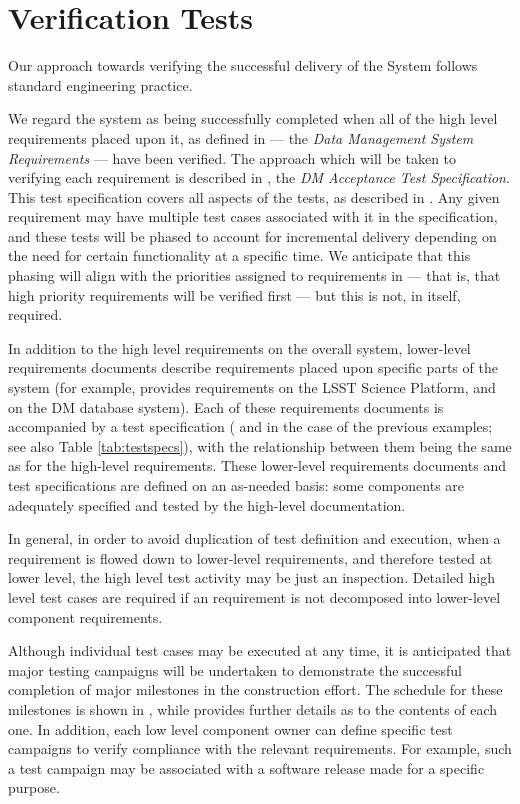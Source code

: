 \section{Verification Tests \label{sect:approach}}

Our approach towards verifying the successful delivery of the \product{} System follows standard engineering practice.

We regard the system as being successfully completed when all of the high level requirements placed upon it, as defined in  --- the \emph{Data Management System Requirements} --- have been verified.
The approach which will be taken to verifying each requirement is described in , the \emph{DM Acceptance Test Specification}.
This test specification covers all aspects of the tests, as described in .
Any given requirement may have multiple test cases associated with it in the specification, and these tests will be phased to account for incremental delivery depending on the need for certain functionality at a specific time.
We anticipate that this phasing will align with the priorities assigned to requirements in  --- that is, that high priority requirements will be verified first --- but this is not, in itself, required.

In addition to the high level requirements on the overall \product{} system, lower-level requirements documents describe requirements placed upon specific parts of the system (for example,  provides requirements on the LSST Science Platform, and  on the DM database system).
Each of these requirements documents is accompanied by a test specification ( and  in the case of the previous examples; see also Table \ref{tab:testspecs}), with the relationship between them being the same as for the high-level requirements.
These lower-level requirements documents and test specifications are defined on an as-needed basis: some \product{} components are adequately specified and tested by the high-level documentation.

In general, in order to avoid duplication of test definition and execution, when a requirement is flowed down to lower-level requirements, and therefore tested at lower level, the high level test activity may be just an inspection.
Detailed high level test cases are required if an  requirement is not decomposed into lower-level component requirements.

Although individual test cases may be executed at any time, it is anticipated that major testing campaigns will be undertaken to demonstrate the successful completion of major milestones in the \product{} construction effort.
The schedule for these milestones is shown in , while  provides further details as to the contents of each one.
In addition, each low level component owner can define specific test campaigns to verify compliance with the relevant requirements.
For example, such a test campaign may be associated with a software release made for a specific purpose.

